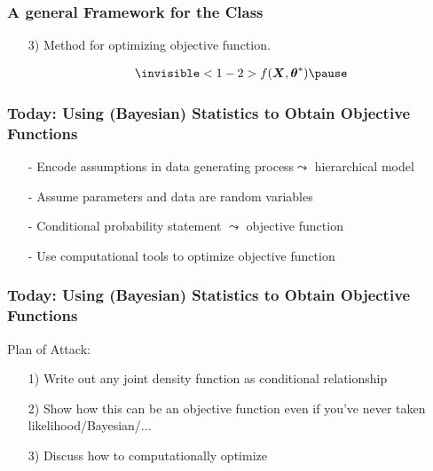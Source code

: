 \documentclass{beamer}
\numberwithin{equation}{section}
\begin{document}
\begin{frame}
\frametitle{A general Framework for the Class}


\begin{itemize}
\item[3)] Method for optimizing objective function. \pause \\
 \pause 


\begin{eqnarray}
\invisible<1-2>{f(\boldsymbol{X}, \boldsymbol{\theta}^{*} )  \nonumber} \pause 
\end{eqnarray}

 \pause 
\begin{itemize}
 \pause 
{} 
\end{itemize}
\end{itemize}

\end{frame}





\begin{frame}
\frametitle{Today: Using (Bayesian) Statistics to Obtain Objective Functions}

\begin{itemize}
\item[-] Encode assumptions in \alert{data generating process}$\leadsto$ hierarchical model
\item[-] Assume parameters and data are random variables
\item[-] Conditional probability statement $\leadsto$ objective function
\item[-] Use computational tools to optimize objective function
\end{itemize}



\end{frame}


\begin{frame}
\frametitle{Today: Using (Bayesian) Statistics to Obtain Objective Functions}

Plan of Attack:
\begin{itemize}
\item[1)] Write out any joint density function as conditional relationship
\item[2)] Show how this can be an objective function \alert{even if you've never taken likelihood/Bayesian/...}
\item[3)] Discuss how to \alert{computationally} optimize
\end{itemize}



\end{frame}
\end{document}
